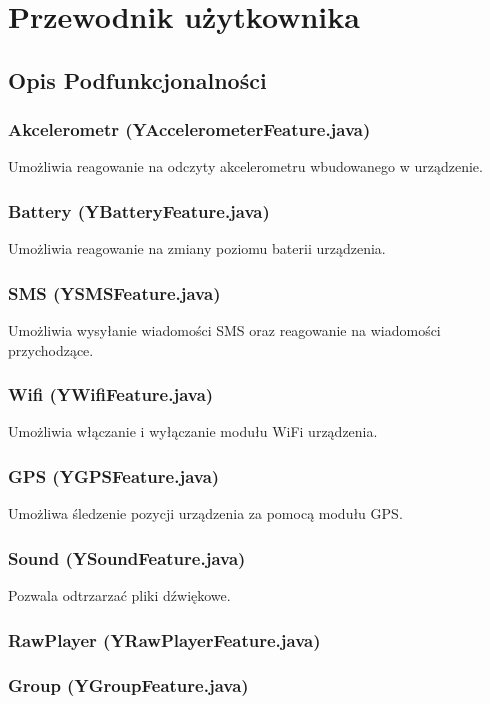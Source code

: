 \documentclass[11pt,a4paper,polish,thesis]{dcsbook}
\begin{document}
\appendix

\chapter{Przewodnik użytkownika}
\section{Opis Podfunkcjonalności}
\subsection{Akcelerometr (YAccelerometerFeature.java)}
Umożliwia reagowanie na odczyty akcelerometru wbudowanego w urządzenie. 

\subsection{Battery (YBatteryFeature.java)}
Umożliwia reagowanie na zmiany poziomu baterii urządzenia.

\subsection{SMS (YSMSFeature.java)}
Umożliwia wysyłanie wiadomości SMS oraz reagowanie na wiadomości przychodzące.

\subsection{Wifi (YWifiFeature.java)}
Umożliwia włączanie i wyłączanie modułu WiFi urządzenia.

\subsection{GPS (YGPSFeature.java)}
Umożliwa śledzenie pozycji urządzenia za pomocą modułu GPS.

\subsection{Sound (YSoundFeature.java)}
Pozwala odtrzarzać pliki dźwiękowe.

\subsection{RawPlayer (YRawPlayerFeature.java)}

\subsection{Group (YGroupFeature.java)}
\end{document}
